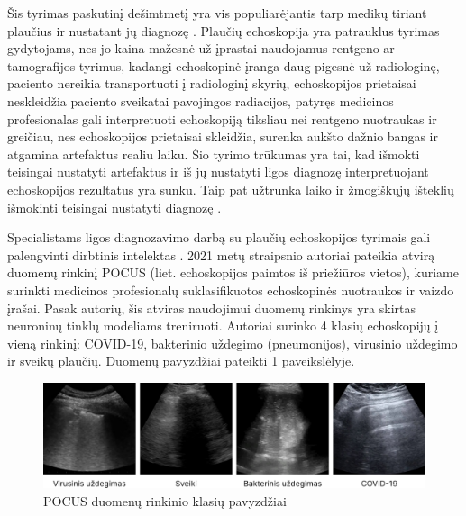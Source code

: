 \documentclass[
]{VUMIFPSbakalaurinis}
\begin{document}
Šis tyrimas paskutinį dešimtmetį yra vis populiarėjantis tarp medikų tiriant plaučius ir nustatant jų diagnozę \cite{demi2023new}. Plaučių echoskopija yra patrauklus tyrimas gydytojams, nes jo kaina mažesnė už įprastai naudojamus rentgeno ar tamografijos tyrimus, kadangi echoskopinė įranga daug pigesnė už radiologinę, paciento nereikia transportuoti į radiologinį skyrių, echoskopijos prietaisai neskleidžia paciento sveikatai pavojingos radiacijos, patyręs medicinos profesionalas gali interpretuoti echoskopiją tiksliau nei rentgeno nuotraukas ir greičiau, nes echoskopijos prietaisai skleidžia, surenka aukšto dažnio bangas ir atgamina artefaktus realiu laiku. Šio tyrimo trūkumas yra tai, kad išmokti teisingai nustatyti artefaktus ir iš jų nustatyti ligos diagnozę interpretuojant echoskopijos rezultatus yra sunku. Taip pat užtrunka laiko ir žmogiškųjų išteklių išmokinti teisingai nustatyti diagnozę \cite{cammarota2023lung}.

Specialistams ligos diagnozavimo darbą su plaučių echoskopijos tyrimais gali palengvinti dirbtinis intelektas \cite{demi2023new, born2021accelerating}. 2021 metų straipsnio autoriai pateikia atvirą duomenų rinkinį POCUS (liet. echoskopijos paimtos iš priežiūros vietos), kuriame surinkti medicinos profesionalų suklasifikuotos echoskopinės nuotraukos ir vaizdo įrašai. Pasak autorių, šis atviras naudojimui duomenų rinkinys yra skirtas neuroninų tinklų modeliams treniruoti. Autoriai surinko 4 klasių echoskopijų į vieną rinkinį: COVID-19, bakterinio uždegimo (pneumonijos), virusinio uždegimo ir sveikų plaučių. Duomenų pavyzdžiai pateikti \ref{img:pocus} paveikslėlyje.

\begin{figure}[H]
    \centering
    \includegraphics[scale=0.20099]{img/pocus.png}
    \caption{POCUS duomenų rinkinio klasių pavyzdžiai \cite{born2021accelerating}}
    \label{img:pocus}
\end{figure}

\printbibliography[heading=bibintoc]
\end{document}
